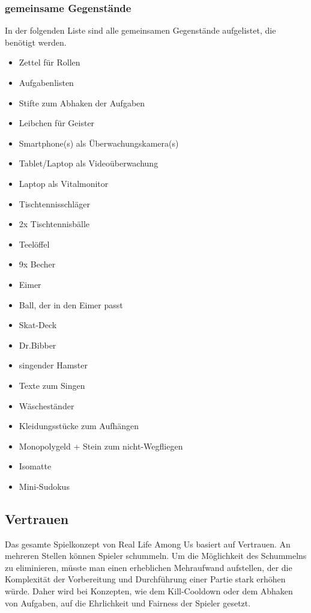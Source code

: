 \subsubsection{gemeinsame Gegenstände}
In der folgenden Liste sind alle gemeinsamen Gegenstände aufgelistet, die
benötigt werden.
\begin{itemize}
    \item Zettel für Rollen
    \item Aufgabenlisten
    \item Stifte zum Abhaken der Aufgaben
    \item Leibchen für Geister
    \item Smartphone(s) als Überwachungskamera(s)
    \item Tablet/Laptop als Videoüberwachung
    \item Laptop als Vitalmonitor
    \item Tischtennisschläger
    \item 2x Tischtennisbälle
    \item Teelöffel
    \item 9x Becher
    \item Eimer
    \item Ball, der in den Eimer passt
    \item Skat-Deck
    \item Dr.Bibber
    \item singender Hamster
    \item Texte zum Singen
    \item Wäscheständer
    \item Kleidungsstücke zum Aufhängen
    \item Monopolygeld + Stein zum nicht-Wegfliegen
    \item Isomatte
    \item Mini-Sudokus
\end{itemize}

\subsection{Vertrauen}
Das gesamte Spielkonzept von Real Life Among Us basiert auf Vertrauen. An
mehreren Stellen können Spieler schummeln. Um die Möglichkeit des Schummelns zu
eliminieren, müsste man einen erheblichen Mehraufwand aufstellen, der die
Komplexität der Vorbereitung und Durchführung einer Partie stark erhöhen würde.
Daher wird bei Konzepten, wie dem Kill-Cooldown oder dem Abhaken von Aufgaben,
auf die Ehrlichkeit und Fairness der Spieler gesetzt.
